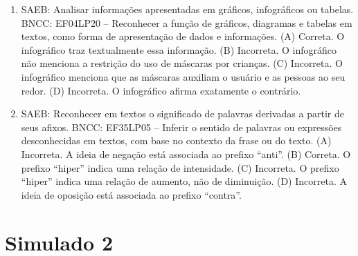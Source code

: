 \begin{enumerate}
\item
SAEB: Analisar informações apresentadas em gráficos, infográficos ou tabelas. BNCC: EF04LP20 -- Reconhecer a função de gráficos, diagramas e tabelas em textos, como forma de apresentação de dados e informações. 
(A) Correta. O infográfico traz textualmente essa informação. 
(B) Incorreta. O infográfico não menciona a restrição do uso de máscaras por crianças. 
(C) Incorreta. O infográfico menciona que as máscaras auxiliam o usuário e as pessoas ao seu redor. 
(D) Incorreta. O infográfico afirma exatamente o contrário.

\item
SAEB: Reconhecer em textos o significado de palavras derivadas a partir de seus afixos. BNCC: EF35LP05 -- Inferir o sentido de palavras ou expressões desconhecidas em textos, com base no contexto da frase ou do texto. 
(A) Incorreta. A ideia de negação está associada ao prefixo ``anti''. 
(B) Correta. O prefixo ``hiper'' indica uma relação de intensidade. 
(C) Incorreta. O prefixo ``hiper'' indica uma relação de aumento, não de diminuição. 
(D) Incorreta. A ideia de oposição está associada ao prefixo ``contra''.
\end{enumerate}

\section*{Simulado 2}

